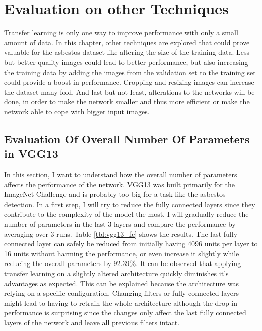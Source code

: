 \chapter{Evaluation on other Techniques}

Transfer learning is only one way to improve performance with only a small amount of data. In this chapter, other techniques are explored that could prove valuable for the asbestos dataset like altering the size of the training data. Less but better quality images could lead to better performance, but also increasing the training data by adding the images from the validation set to the training set could provide a boost in performance. Cropping and resizing images can increase the dataset many fold. And last but not least, alterations to the networks will be done, in order to make the network smaller and thus more efficient or make the network able to cope with bigger input images.

\section{Evaluation Of Overall Number Of Parameters in VGG13}

In this section, I want to understand how the overall number of parameters affects the performance of the network. VGG13 was built primarily for the ImageNet Challenge and is probably too big for a task like the asbestos detection. In a first step, I will try to reduce the fully connected layers since they contribute to the complexity of the model the most. I will gradually reduce the number of parameters in the last 3 layers and compare the performance by averaging over 3 runs. Table \ref{tbl:vgg13_fc} shows the results. The last fully connected layer can safely be reduced from initially having 4096 units per layer to 16 units without harming the performance, or even increase it slightly while reducing the overall parameters by 92.39\%. It can be observed that applying transfer learning on a slightly altered architecture quickly diminishes it's advantages as expected. This can be explained because the architecture was relying on a specific configuration. Changing filters or fully connected layers might lead to having to retrain the whole architecture although the drop in performance is surprising since the changes only affect the last fully connected layers of the network and leave all previous filters intact.


